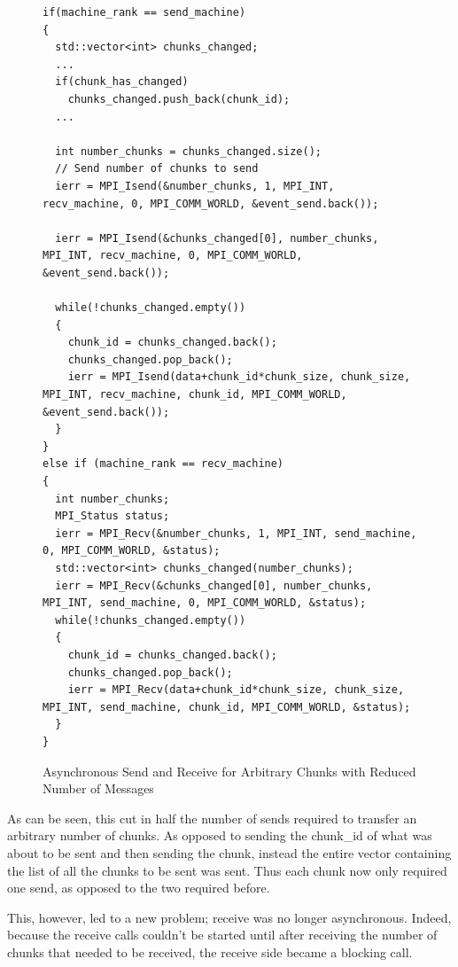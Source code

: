 \documentclass[../thesis.tex]{subfiles}
\begin{document}
    \begin{figure}[htbp]
      \centering
      \lstset{language=cpp}  
      \begin{lstlisting}[tabsize=2]
if(machine_rank == send_machine)
{
  std::vector<int> chunks_changed;
  ...
  if(chunk_has_changed)
    chunks_changed.push_back(chunk_id);
  ...

  int number_chunks = chunks_changed.size();
  // Send number of chunks to send
  ierr = MPI_Isend(&number_chunks, 1, MPI_INT, recv_machine, 0, MPI_COMM_WORLD, &event_send.back());

  ierr = MPI_Isend(&chunks_changed[0], number_chunks, MPI_INT, recv_machine, 0, MPI_COMM_WORLD, &event_send.back());

  while(!chunks_changed.empty())
  {
    chunk_id = chunks_changed.back();
    chunks_changed.pop_back();
    ierr = MPI_Isend(data+chunk_id*chunk_size, chunk_size, MPI_INT, recv_machine, chunk_id, MPI_COMM_WORLD, &event_send.back());
  }
}
else if (machine_rank == recv_machine)
{
  int number_chunks;
  MPI_Status status;
  ierr = MPI_Recv(&number_chunks, 1, MPI_INT, send_machine, 0, MPI_COMM_WORLD, &status);
  std::vector<int> chunks_changed(number_chunks);
  ierr = MPI_Recv(&chunks_changed[0], number_chunks, MPI_INT, send_machine, 0, MPI_COMM_WORLD, &status);
  while(!chunks_changed.empty())
  {
    chunk_id = chunks_changed.back();
    chunks_changed.pop_back();
    ierr = MPI_Recv(data+chunk_id*chunk_size, chunk_size, MPI_INT, send_machine, chunk_id, MPI_COMM_WORLD, &status);
  }       
}
        \end{lstlisting}

      \caption{Asynchronous Send and Receive for Arbitrary Chunks with Reduced Number of Messages}
      \label{fig:final_send_receive}
    \end{figure}


    As can be seen, this cut in half the number of sends required to transfer an arbitrary number of chunks. As opposed to sending the chunk\_id of what was about to be sent and then sending the chunk, instead the entire vector containing the list of all the chunks to be sent was sent. Thus each chunk now only required one send, as opposed to the two required before.

    This, however, led to a new problem; receive was no longer asynchronous. Indeed, because the receive calls couldn't be started until after receiving the number of chunks that needed to be received, the receive side became a blocking call.

\end{document}

